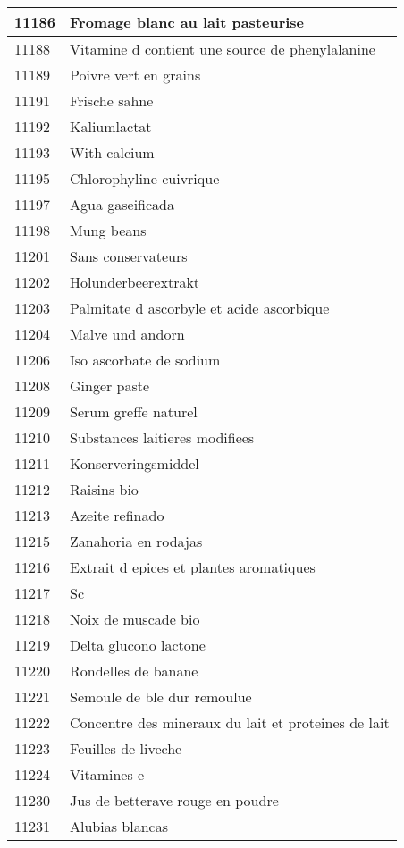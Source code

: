 \begin{longtable}{|l|l|}
11186 & Fromage blanc au lait pasteurise \\ \hline 
11188 & Vitamine d contient une source de phenylalanine \\ \hline 
11189 & Poivre vert en grains \\ \hline 
11191 & Frische sahne \\ \hline 
11192 & Kaliumlactat \\ \hline 
11193 & With calcium \\ \hline 
11195 & Chlorophyline cuivrique \\ \hline 
11197 & Agua gaseificada \\ \hline 
11198 & Mung beans \\ \hline 
11201 & Sans conservateurs \\ \hline 
11202 & Holunderbeerextrakt \\ \hline 
11203 & Palmitate d ascorbyle et acide ascorbique \\ \hline 
11204 & Malve und andorn \\ \hline 
11206 & Iso ascorbate de sodium \\ \hline 
11208 & Ginger paste \\ \hline 
11209 & Serum greffe naturel \\ \hline 
11210 & Substances laitieres modifiees \\ \hline 
11211 & Konserveringsmiddel \\ \hline 
11212 & Raisins bio \\ \hline 
11213 & Azeite refinado \\ \hline 
11215 & Zanahoria en rodajas \\ \hline 
11216 & Extrait d epices et plantes aromatiques \\ \hline 
11217 & Sc \\ \hline 
11218 & Noix de muscade bio \\ \hline 
11219 & Delta glucono lactone \\ \hline 
11220 & Rondelles de banane \\ \hline 
11221 & Semoule de ble dur remoulue \\ \hline 
11222 & Concentre des mineraux du lait et proteines de lait \\ \hline 
11223 & Feuilles de liveche \\ \hline 
11224 & Vitamines e \\ \hline 
11230 & Jus de betterave rouge en poudre \\ \hline 
11231 & Alubias blancas \\ \hline 

\end{longtable}
